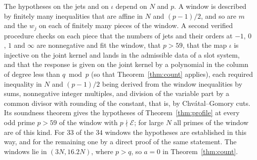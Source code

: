 The hypotheses on the jets and on $\iota$ depend on $N$ and $p$. A window is described by finitely many
inequalities that are affine in $N$ and $(p-1)/2$, and so are $m$ and the $w_j$ on each of finitely many
pieces of the window. A second verified procedure checks on each piece that the numbers of jets and their
orders at $-1$, $0$, $1$ and $\infty$ are nonnegative and fit the window, that $p>59$, that the map $\iota$
is injective on the joint kernel and lands in the admissible data of a slot system, and that the response is
given on the joint kernel by a polynomial in the column of degree less than $q \bmod p$ (so that
Theorem~\ref{thm:count} applies), each required inequality in $N$ and $(p-1)/2$ being derived from the
window inequalities by sums, nonnegative integer multiples, and division of the variable part by a common
divisor with rounding of the constant, that is, by Chv\'atal--Gomory cuts. Its soundness theorem gives the
hypotheses of Theorem~\ref{thm:profile} at every odd prime $p>59$ of the window with $p\nmid\mathcal E$;
for large $N$ all primes of the window are of this kind. For $33$ of the $34$ windows the hypotheses are
established in this way, and for the remaining one by a direct proof of the same statement. The windows
lie in $(3N,16.2N)$, where $p>q$, so $a=0$ in Theorem~\ref{thm:count}.

